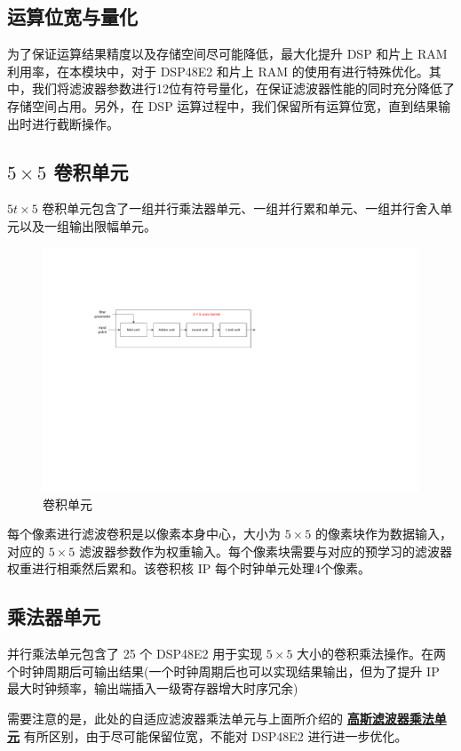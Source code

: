 \documentclass[12pt, a4paper, oneside]{ctexbook}
\begin{document}
	\subsection{运算位宽与量化}
	为了保证运算结果精度以及存储空间尽可能降低，最大化提升 DSP 和片上 RAM 利用率，在本模块中，对于 DSP48E2 和片上 RAM 的使用有进行特殊优化。其中，我们将滤波器参数进行12位有符号量化，在保证滤波器性能的同时充分降低了存储空间占用。另外，在 DSP 运算过程中，我们保留所有运算位宽，直到结果输出时进行截断操作。
	\subsection{$5\times5$ 卷积单元}
	$5t\times5$ 卷积单元包含了一组并行乘法器单元、一组并行累和单元、一组并行舍入单元以及一组输出限幅单元。
		\begin{figure}[h]
		\centering
		\includegraphics[scale=0.7]{pic/conv.pdf}
		\caption{卷积单元}
		\end{figure}	
	每个像素进行滤波卷积是以像素本身中心，大小为 $5\times5$ 的像素块作为数据输入，对应的 $5\times5$ 滤波器参数作为权重输入。每个像素块需要与对应的预学习的滤波器权重进行相乘然后累和。该卷积核 IP 每个时钟单元处理4个像素。
	\subsection{乘法器单元}
	并行乘法单元包含了 25 个 DSP48E2 用于实现 $5\times5$ 大小的卷积乘法操作。在两个时钟周期后可输出结果(一个时钟周期后也可以实现结果输出，但为了提升 IP 最大时钟频率，输出端插入一级寄存器增大时序冗余) \par 需要注意的是，此处的自适应滤波器乘法单元与上面所介绍的 \hyperref[mul_unit]{\textbf{高斯滤波器乘法单元}} 有所区别，由于尽可能保留位宽，不能对 DSP48E2 进行进一步优化。%
\end{document}
